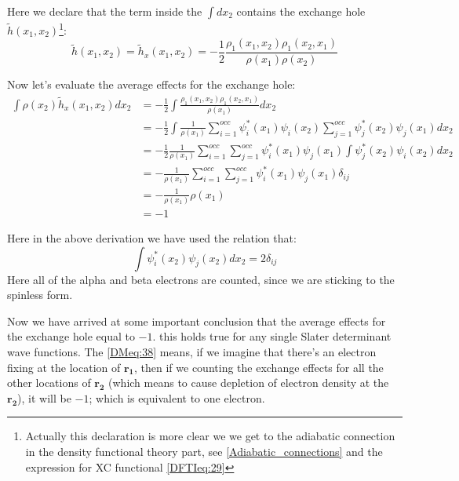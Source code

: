 Here we declare that the term inside the $\int dx_{2}$ contains the exchange
hole $\widetilde{h}(x_{1}, x_{2})$\footnote{Actually this declaration is more
clear we we get to the adiabatic connection in the density functional theory
part, see \ref{Adiabatic_connections} and the expression for XC functional 
\ref{DFTIeq:29}}:
\begin{equation}\label{DMeq:37}
\widetilde{h}(x_{1}, x_{2})
 =\widetilde{h}_{x}(x_{1}, x_{2}) = -\frac{1}{2}
\frac{\rho_{1}(x_{1},x_{2})\rho_{1}(x_{2},x_{1})}{\rho(x_{1})\rho(x_{2})}
\end{equation}

Now let's evaluate the average effects for the exchange hole:
\begin{align}\label{DMeq:38}
\int\rho(x_{2})\widetilde{h}_{x}(x_{1}, x_{2})dx_{2} &= -\frac{1}{2}\int
\frac{\rho_{1}(x_{1},x_{2})\rho_{1}(x_{2},x_{1})}{\rho(x_{1})}dx_{2}
\nonumber \\
&=-\frac{1}{2}\int\frac{1}{\rho(x_{1})}
\sum_{i=1}^{occ}\psi^{*}_{i}(x_{1})\psi_{i}(x_{2})
\sum_{j=1}^{occ}\psi^{*}_{j}(x_{2})\psi_{j}(x_{1})
dx_{2} \nonumber \\
&=-\frac{1}{2}\frac{1}{\rho(x_{1})}
\sum_{i=1}^{occ}\sum_{j=1}^{occ}\psi^{*}_{i}(x_{1})\psi_{j}(x_{1})
\int\psi^{*}_{j}(x_{2})\psi_{i}(x_{2})dx_{2} \nonumber \\
&= -\frac{1}{\rho(x_{1})}
\sum_{i=1}^{occ}\sum_{j=1}^{occ}\psi^{*}_{i}(x_{1})\psi_{j}(x_{1})
\delta_{ij} \nonumber \\
&= -\frac{1}{\rho(x_{1})}\rho(x_{1}) \nonumber \\
&= -1
\end{align}

Here in the above derivation we have used the relation that:
\begin{equation}\label{}
\int\psi^{*}_{i}(x_{2})\psi_{j}(x_{2})dx_{2} = 2\delta_{ij}
\end{equation}
Here all of the alpha and beta electrons are counted, since we are 
sticking to the spinless form. 

Now we have arrived at some important conclusion that the average
effects for the exchange hole equal to $-1$. this holds true for any
single Slater determinant wave functions. The \ref{DMeq:38} means, if we
imagine that there's an electron fixing at the location of
$\bm{r_{1}}$, then if we counting the exchange effects for all the
other locations of $\bm{r_{2}}$ (which means to cause depletion of electron 
density at the $\bm{r_{2}}$), it will be $-1$; which is
equivalent to one electron.






